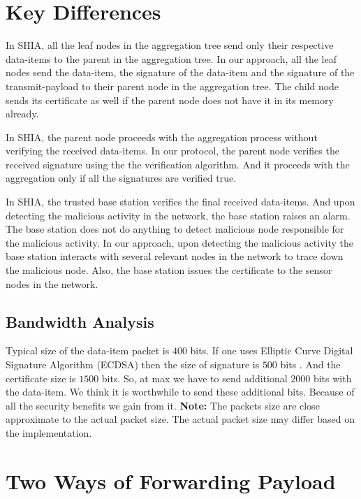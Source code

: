 \section{Key Differences}

	In SHIA, all the leaf nodes in the aggregation tree send only their respective data-items to the parent in the aggregation tree.
	In our approach, all the leaf nodes send the data-item, the signature of the data-item and the signature of the transmit-payload to their parent node in the aggregation tree. 
	The child node sends its certificate as well if the parent node does not have it in its memory already.

	In SHIA, the parent node proceeds with the aggregation process without verifying the received data-items.
	In our protocol, the parent node verifies the received signature using the the verification algorithm.
	And it proceeds with the aggregation only if all the signatures are verified true.

	In SHIA, the trusted base station verifies the final received data-items.
	And upon detecting the malicious activity in the network, the base station raises an alarm. 
	The base station does not do anything to detect malicious node responsible for the malicious activity.
	In our approach, upon detecting the malicious activity the base station interacts with several relevant nodes in the network to trace down the malicious node.
	Also, the base station issues the certificate to the sensor nodes in the network.
	
	\subsection{Bandwidth Analysis}
	
		Typical size of the data-item packet is $400$ bits.
		If one uses Elliptic Curve Digital Signature Algorithm (ECDSA) then the size of signature is $500$ bits \cite{ecdsa2009186}.
		And the certificate size is $1500$ bits.
		So, at max we have to send additional $2000$ bits with the data-item.
		We think it is worthwhile to send these additional bits.
		Because of all the security benefits we gain from it. 
		\textbf{Note:} The packets size are close approximate to the actual packet size. 
		The actual packet size may differ based on the implementation.

\section{Two Ways of Forwarding Payload}	
	
